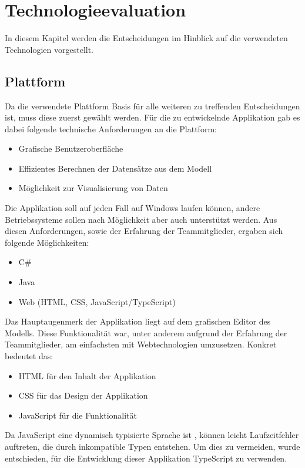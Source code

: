 
\chapter{Technologieevaluation}

In diesem Kapitel werden die Entscheidungen im Hinblick auf die verwendeten Technologien vorgestellt.

\section{Plattform}

Da die verwendete Plattform Basis für alle weiteren zu treffenden Entscheidungen ist, muss diese zuerst gewählt werden. Für die zu entwickelnde Applikation gab es dabei folgende technische Anforderungen an die Plattform:

\begin{itemize}
    \item Grafische Benutzeroberfläche
    \item Effizientes Berechnen der Datensätze aus dem Modell
    \item Möglichkeit zur Visualisierung von Daten
\end{itemize}

Die Applikation soll auf jeden Fall auf Windows laufen können, andere Betriebssysteme sollen nach Möglichkeit aber auch unterstützt werden. Aus diesen Anforderungen, sowie der Erfahrung der Teammitglieder, ergaben sich folgende Möglichkeiten:
\begin{itemize}
    \item C\#
    \item Java
    \item Web (HTML, CSS, JavaScript/TypeScript)
\end{itemize}

Das Hauptaugenmerk der Applikation liegt auf dem grafischen Editor des Modells. Diese Funktionalität war, unter anderem aufgrund der Erfahrung der Teammitglieder, am einfachsten mit Webtechnologien umzusetzen. Konkret bedeutet das:
\begin{itemize}
    \item HTML für den Inhalt der Applikation
    \item CSS für das Design der Applikation
    \item JavaScript für die Funktionalität
\end{itemize}

Da JavaScript eine dynamisch typisierte Sprache ist \cite{mdn:javascript}, können leicht Laufzeitfehler auftreten, die durch inkompatible Typen entstehen. Um dies zu vermeiden, wurde entschieden, für die Entwicklung dieser Applikation TypeScript zu verwenden.

